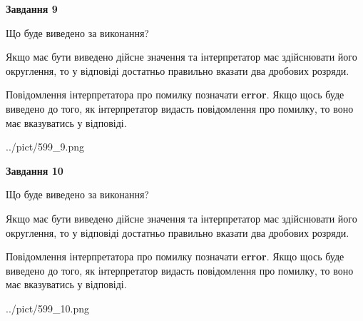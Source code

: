 \documentclass[12pt, ukrainian]{article}
\begin{document}
{\begin {Large}
{\begin {center}\textbf{Завдання 9}\end {center}}\par
Що буде виведено за виконання? \par

Якщо має бути виведено дійсне значення та інтерпретатор має здійснювати його округлення, 
то у відповіді достатньо правильно вказати два дробових розряди.

Повідомлення інтерпретатора про помилку позначати \textbf{error}.
Якщо щось буде виведено до того, як інтерпретатор видасть повідомлення про помилку, 
то воно має вказуватись у відповіді. \par

\begin{center}
	{../pict/599_9.png}
\end{center}
\newpage

{\begin {center}\textbf{Завдання 10}\end {center}}\par
Що буде виведено за виконання? \par

Якщо має бути виведено дійсне значення та інтерпретатор має здійснювати його округлення, 
то у відповіді достатньо правильно вказати два дробових розряди.

Повідомлення інтерпретатора про помилку позначати \textbf{error}.
Якщо щось буде виведено до того, як інтерпретатор видасть повідомлення про помилку, 
то воно має вказуватись у відповіді. \par

\begin{center}
	{../pict/599_10.png}
\end{center}
\newpage

\end {Large}}
\end{document}
